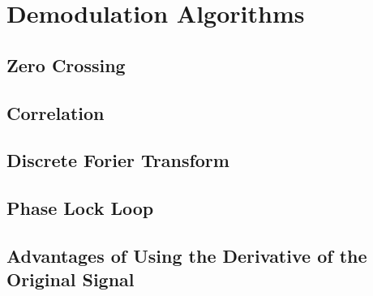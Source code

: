 \chapter{Demodulation Algorithms}

\section{Zero Crossing}

\section{Correlation}

\section{Discrete Forier Transform}

\section{Phase Lock Loop}

\section{Advantages of Using the Derivative of the Original Signal}
